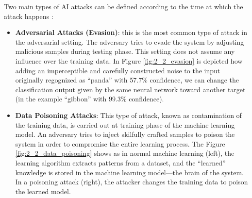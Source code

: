 Two main types of AI attacks can be defined according to the time at which the attack happens \cite{journals/corr/abs-1810-00069}:
\begin{itemize}
    \item \textbf{Adversarial Attacks (Evasion)}: this is the most common type of attack in
    the adversarial setting. The adversary tries to evade the system by adjusting malicious samples during testing phase. This
    setting does not assume any influence over the training data.
    In Figure \ref{fig:2_2_evasion} is depicted how adding an imperceptible and carefully constructed noise to the input originally regognized as “panda” with 57.7\% confidence, we can change
    the classification output given by the same neural network toward another target (in the example “gibbon” with 99.3\% confidence).
    \item \textbf{Data Poisoning Attacks}: This type of attack, known as contamination of the training data, is carried out at training phase of
    the machine learning model. An adversary tries to inject
    skilfully crafted samples to poison the system in order to
    compromise the entire learning process. The Figure \ref{fig:2_2_data_poisoning} shows as in normal machine learning (left), the learning algorithm extracts
    patterns from a dataset, and the “learned” knowledge is stored in the machine
    learning model---the brain of the system. In a poisoning attack (right), the
    attacker changes the training data to poison the learned model. 
\end{itemize}

